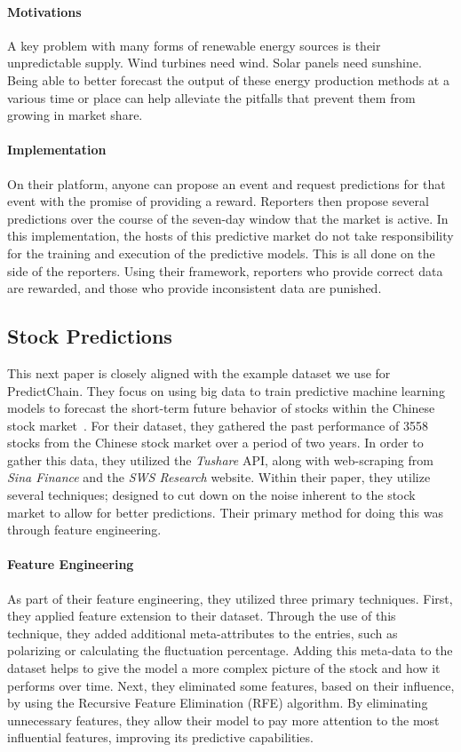 \documentclass{ledger}
\begin{document}
\paragraph{Motivations}
A key problem with many forms of renewable energy sources is their unpredictable supply. Wind turbines need wind. Solar
panels need sunshine. Being able to better forecast the output of these energy production methods at a various time or
place can help alleviate the pitfalls that prevent them from growing in market share.

\paragraph{Implementation}
On their platform, anyone can propose an event and request predictions for that event with the promise of providing a
reward.  Reporters then propose several predictions over the course of the seven-day window that the market is active.
In this implementation, the hosts of this predictive market do not take responsibility for the training and execution of
the predictive models.  This is all done on the side of the reporters.  Using their framework, reporters who provide
correct data are rewarded, and those who provide inconsistent data are punished.

\subsection{Stock Predictions}

This next paper is closely aligned with the example dataset we use for PredictChain.  They focus on using big data to
train predictive machine learning models to forecast the short-term future behavior of stocks within the Chinese stock
market~\cite{deepPrediction}.  For their dataset, they gathered the past performance of 3558 stocks from the Chinese
stock market over a period of two years.  In order to gather this data, they utilized the \textit{Tushare} API, along
with web-scraping from \textit{Sina Finance} and the \textit{SWS Research} website. Within their paper, they utilize
several techniques; designed to cut down on the noise inherent to the stock market to allow for better predictions.
Their primary method for doing this was through feature engineering.

\paragraph{Feature Engineering}
As part of their feature engineering, they utilized three primary techniques.  First, they applied feature extension to
their dataset.  Through the use of this technique, they added additional meta-attributes to the entries, such as
polarizing or calculating the fluctuation percentage.  Adding this meta-data to the dataset helps to give the model a
more complex picture of the stock and how it performs over time.  Next, they eliminated some features, based on their
influence, by using the Recursive Feature Elimination (RFE) algorithm.  By eliminating unnecessary features, they allow
their model to pay more attention to the most influential features, improving its predictive capabilities.
\end{document}
